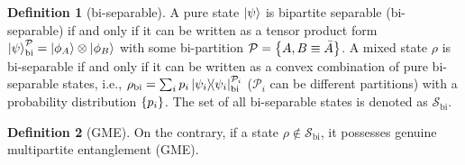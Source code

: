 \documentclass[
aps,
pra,
twocolumn,
floatfix,
]{revtex4-2}
\theoremstyle{plain}
\theoremstyle{definition}
\newtheorem{definition}{Definition}
\newcommand{\dm}{\rho}
\newcommand{\bi}{\text{bi}}
\newcommand{\separableset}{\mathcal{S}}
\newcommand{\ppartition}{\mathcal{P}}
\begin{document}
\begin{definition}[bi-separable]\label{def:bipartite_separable}
	A pure state $\ket{\psi}$ is bipartite separable (bi-separable) if and only if it can be written as a tensor product form 
	$\ket{\psi}_{\bi}^{\ppartition} = \ket{\phi_{A}}\otimes\ket{\phi_{B}}$ with some bi-partition $\ppartition=\qty{A,B\equiv \bar{A}}$. 
	A mixed state $\dm$ is bi-separable if and only if it can be written as a convex combination of pure bi-separable states, i.e.,
	$\dm_{\bi}=\sum_i p_i \op{\psi_i}_\bi^{\ppartition_i}$ 
	($\ppartition_i$ can be different partitions)
	with a probability distribution $\qty{p_i}$.
	The set of all bi-separable states is denoted as $\separableset_\bi$.
\end{definition}
\begin{definition}[GME]\label{def:gme}
	On the contrary, if a state $\dm\notin \separableset_\bi$,
	it possesses genuine multipartite entanglement (GME).
\end{definition}
\end{document}
